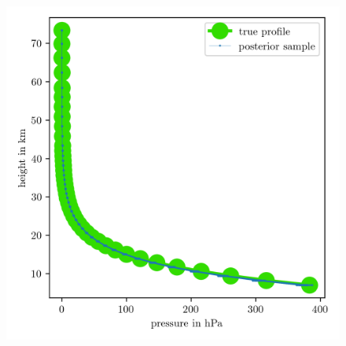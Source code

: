\begin{figure}[ht!]
	\centering
	\includegraphics{PressPostMeanSigm.png}
	\caption[]{}
	\label{fig:PressPost}
\end{figure}



